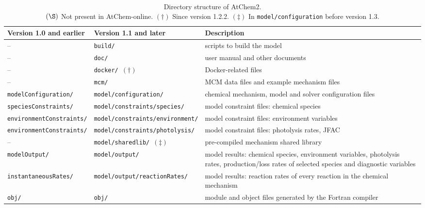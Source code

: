 \begin{table}[htb]
  \centering \scriptsize
  \caption{Directory structure of AtChem2.\\
    $(\S)$ Not present in AtChem-online. $(\dag)$ Since version 1.2.2. $(\ddag)$ In
    \texttt{model/configuration} before version 1.3.}
  \label{tab:atchem-dirs}
  \begin{tabular}{llp{3.9cm}}
    Version 1.0 and earlier & Version 1.1 and later & Description\\
    \hline
    --                               & \texttt{build/}                         & scripts to build the model\\
    \hline
    --                               & \texttt{doc/}                           & user manual and other documents\\
    \hline
    --                               & \texttt{docker/}~$(\dag)$               & Docker-related files\\
    \hline
    --                               & \texttt{mcm/}                           & MCM data files and example mechanism files\\
    \hline
    \texttt{modelConfiguration/}     & \texttt{model/configuration/}           & chemical mechanism, model and solver configuration files\\
    \hline
    \texttt{speciesConstraints/}     & \texttt{model/constraints/species/}     & model constraint files: chemical species\\
    \hline
    \texttt{environmentConstraints/} & \texttt{model/constraints/environment/} & model constraint files: environment variables\\
    \hline
    \texttt{environmentConstraints/} & \texttt{model/constraints/photolysis/}  & model constraint files: photolysis rates, JFAC\\
    \hline
    --                               & \texttt{model/sharedlib/}~$(\ddag)$     & pre-compiled mechanism shared library\\
    \hline
    \texttt{modelOutput/}            & \texttt{model/output/}                  & model results: chemical species, environment variables, photolysis rates, production/loss rates of selected species and diagnostic variables\\
    \hline
    \texttt{instantaneousRates/}     & \texttt{model/output/reactionRates/}    & model results: reaction rates of every reaction in the chemical mechanism\\
    \hline
    \texttt{obj/}                    & \texttt{obj/}                           & module and object files generated by the Fortran compiler\\

\end{tabular}
\end{table}
